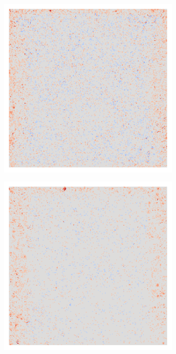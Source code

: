 \begin{figure}[H]
\begin{subfigure}{0.095\linewidth}
    \end{subfigure}\hfill%
    \begin{subfigure}{0.095\linewidth}
        \centering
        \includegraphics[height=1\linewidth]{01-images/05-resultate/uap_resnet18/uap0-resnet18-mri_data-n200-robustificationslevel5.png}
    \end{subfigure}\hfill%
    \begin{subfigure}{0.095\linewidth}
        \centering
        \includegraphics[height=1\linewidth]{01-images/05-resultate/uap_resnet18/uap0-resnet18-mri_data-n200-robustificationslevel6.png}

\end{subfigure}
\end{figure}
